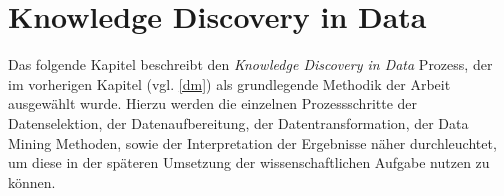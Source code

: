 \section{Knowledge Discovery in Data}
\label{kdd}

Das folgende Kapitel beschreibt den \textit{Knowledge Discovery in Data} Prozess, der im vorherigen Kapitel (vgl. \vref{dm}) als grundlegende Methodik der Arbeit ausgewählt wurde. Hierzu werden die einzelnen Prozessschritte der Datenselektion, der Datenaufbereitung, der Datentransformation, der Data Mining Methoden, sowie der Interpretation der Ergebnisse näher durchleuchtet, um diese in der späteren Umsetzung der wissenschaftlichen Aufgabe nutzen zu können.